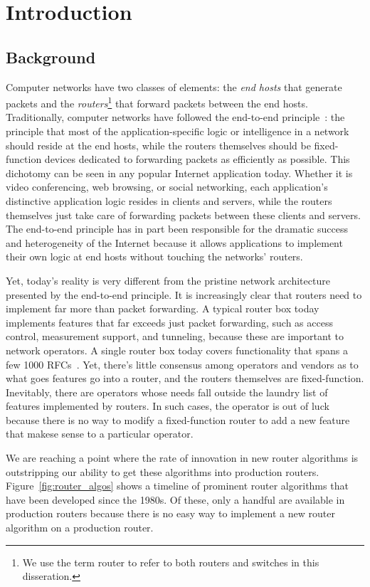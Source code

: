 \chapter{Introduction}
\label{chap:intro}

\section{Background}
Computer networks have two classes of elements: the \textit{end hosts} that
generate packets and the \textit{routers}\footnote{We use the term router to
refer to both routers and switches in this disseration.} that forward packets
between the end hosts. Traditionally, computer networks have followed the
end-to-end principle~\cite{e2e}: the principle that most of the
application-specific logic or intelligence in a network should reside at the
end hosts, while the routers themselves should be fixed-function devices
dedicated to forwarding packets as efficiently as possible. This dichotomy can
be seen in any popular Internet application today. Whether it is video
conferencing, web browsing, or social networking, each application's
distinctive application logic resides in clients and servers, while the routers
themselves just take care of forwarding packets between these clients and
servers. The end-to-end principle has in part been responsible for the dramatic
success and heterogeneity of the Internet because it allows applications to
implement their own logic at end hosts without touching the networks' routers.

Yet, today's reality is very different from the pristine network architecture
presented by the end-to-end principle. It is increasingly clear that routers
need to implement far more than packet forwarding. A typical router box today
implements features that far exceeds just packet forwarding, such as access
control, measurement support, and tunneling, because these are important to
network operators. A single router box today covers functionality that spans a
few 1000 RFCs~\cite{lavanya_compiler}. Yet, there's little consensus among
operators and vendors as to what goes features go into a router, and the
routers themselves are fixed-function. Inevitably, there are operators whose
needs fall outside the laundry list of features implemented by routers. In such
cases, the operator is out of luck because there is no way to modify a
fixed-function router to add a new feature that makese sense to a particular
operator.

We are reaching a point where the rate of innovation in new router algorithms
is outstripping our ability to get these algorithms into production routers.
Figure~\ref{fig:router_algos} shows a timeline of prominent router algorithms
that have been developed since the 1980s. Of these, only a handful are
available in production routers because there is no easy way to implement a new
router algorithm on a production router.

